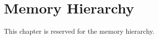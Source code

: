 \chapter{Memory Hierarchy}
\label{chap:memory-hierarchy}

This chapter is reserved for the memory hierarchy.

